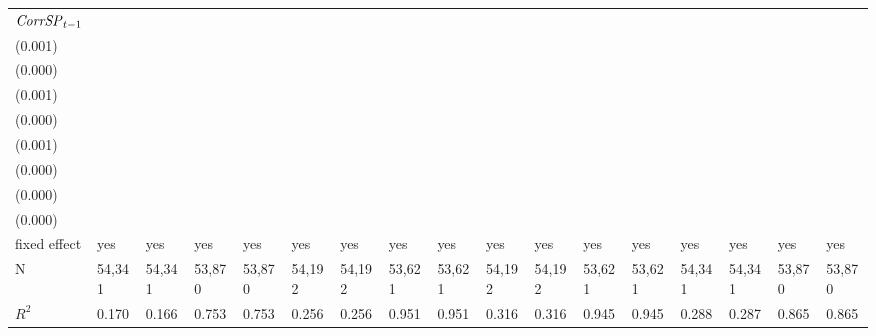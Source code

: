 \begin{tabular}{lllllllllllllllll}
${{\it CorrSP}}_{t-1}$       &                                     &  \makecell{$-0.014^{**}$ \\(0.001)} &                                     &  \makecell{$-0.002^{**}$ \\(0.000)} &                                     &  \makecell{$-0.005^{**}$ \\(0.001)} &                                     &    \makecell{$-0.000^{}$ \\(0.000)} &                                     &  \makecell{$-0.003^{**}$ \\(0.001)} &                                     &    \makecell{$-0.000^{}$ \\(0.000)} &                                     &   \makecell{$-0.000^{}$ \\(0.000)} &                                    &    \makecell{$0.000^{}$ \\(0.000)} \\
fixed effect                 &                                 yes &                                 yes &                                 yes &                                 yes &                                 yes &                                 yes &                                 yes &                                 yes &                                 yes &                                 yes &                                 yes &                                 yes &                                 yes &                                yes &                                yes &                                yes \\
N                            &                              54,341 &                              54,341 &                              53,870 &                              53,870 &                              54,192 &                              54,192 &                              53,621 &                              53,621 &                              54,192 &                              54,192 &                              53,621 &                              53,621 &                              54,341 &                             54,341 &                             53,870 &                             53,870 \\
$R^2$                        &                               0.170 &                               0.166 &                               0.753 &                               0.753 &                               0.256 &                               0.256 &                               0.951 &                               0.951 &                               0.316 &                               0.316 &                               0.945 &                               0.945 &                               0.288 &                              0.287 &                              0.865 &                              0.865 \\

\end{tabular}
